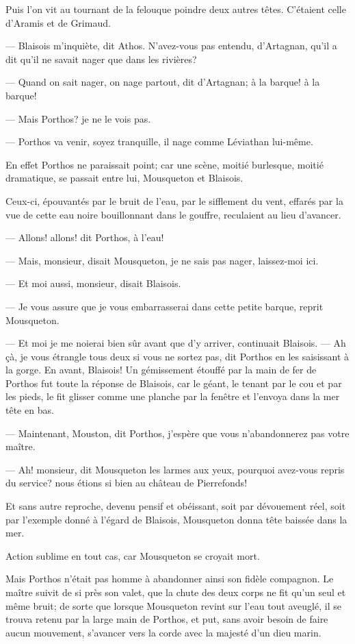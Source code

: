 Puis l'on vit au tournant de la felouque poindre deux autres têtes. C'étaient celle d'Aramis et de Grimaud.

— Blaisois m'inquiète, dit Athos. N'avez-vous pas entendu, d'Artagnan, qu'il a dit qu'il ne savait nager que dans les rivières?

— Quand on sait nager, on nage partout, dit d'Artagnan; à la barque! à la barque!

— Mais Porthos? je ne le vois pas.

— Porthos va venir, soyez tranquille, il nage comme Léviathan lui-même.

En effet Porthos ne paraissait point; car une scène, moitié burlesque, moitié dramatique, se passait entre lui, Mousqueton et Blaisois.

Ceux-ci, épouvantés par le bruit de l'eau, par le sifflement du vent, effarés par la vue de cette eau noire bouillonnant dans le gouffre, reculaient au lieu d'avancer.

— Allons! allons! dit Porthos, à l'eau!

— Mais, monsieur, disait Mousqueton, je ne sais pas nager, laissez-moi ici.

— Et moi aussi, monsieur, disait Blaisois.

— Je vous assure que je vous embarrasserai dans cette petite barque, reprit Mousqueton.

— Et moi je me noierai bien sûr avant que d'y arriver, continuait Blaisois.
— Ah çà, je vous étrangle tous deux si vous ne sortez pas, dit Porthos en les saisissant à la gorge. En avant, Blaisois!
Un gémissement étouffé par la main de fer de Porthos fut toute la réponse de Blaisois, car le géant, le tenant par le cou et par les pieds, le fit glisser comme une planche par la fenêtre et l'envoya dans la mer tête en bas.

— Maintenant, Mouston, dit Porthos, j'espère que vous n'abandonnerez pas votre maître.

— Ah! monsieur, dit Mousqueton les larmes aux yeux, pourquoi avez-vous repris du service? nous étions si bien au château de Pierrefonds!

Et sans autre reproche, devenu pensif et obéissant, soit par dévouement réel, soit par l'exemple donné à l'égard de Blaisois, Mousqueton donna tête baissée dans la mer.

Action sublime en tout cas, car Mousqueton se croyait mort.

Mais Porthos n'était pas homme à abandonner ainsi son fidèle compagnon. Le maître suivit de si près son valet, que la chute des deux corps ne fit qu'un seul et même bruit; de sorte que lorsque Mousqueton revint sur l'eau tout aveuglé, il se trouva retenu par la large main de Porthos, et put, sans avoir besoin de faire aucun mouvement, s'avancer vers la corde avec la majesté d'un dieu marin.

